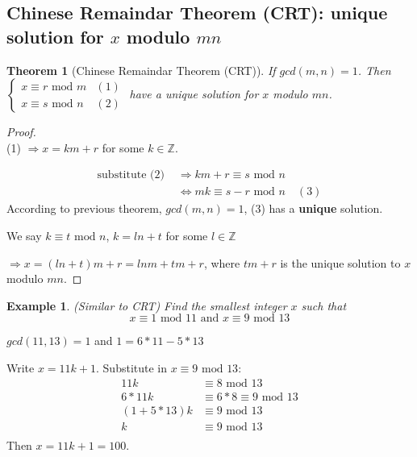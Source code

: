 \documentclass[11pt,a4paper]{article}
\newtheorem{theorem}{Theorem}
\newtheorem{example}{Example}
\begin{document}
\subsection{Chinese Remaindar Theorem (CRT): unique solution for $x$ modulo $mn$}
\begin{theorem}[Chinese Remaindar Theorem (CRT)]
\quad

If $gcd(m,n)=1$. Then $\left\{\begin{matrix}
    x\equiv r \text{ mod }m& (1)\\
    x\equiv s \text{ mod }n& (2)
\end{matrix}\right.$ have a unique solution for $x$ modulo $mn$.
\end{theorem}
\begin{proof}
\quad\\
(1) $\Rightarrow x=km+r$ for some $k\in \mathbb{Z}$.

\begin{equation}
    \begin{aligned}
        \text{substitute (2) }&\Rightarrow	km+r\equiv s \text{ mod }n\\ &\Leftrightarrow	mk\equiv s-r \text{ mod }n\quad (3)
    \end{aligned}
    \nonumber
\end{equation}
According to previous theorem, $gcd(m,n)=1$, (3) has a \textbf{unique} solution.

We say $k\equiv t \text{ mod }n$, $k=ln+t$ for some $l\in \mathbb{Z}$

$\Rightarrow x=(ln+t)m+r=lnm+tm+r$, where $tm+r$ is the unique solution to $x$ modulo $mn$.
\end{proof}

\begin{example}(Similar to CRT)
Find the smallest integer $x$ such that $$x\equiv 1 \text{ mod }11\text{ and }x\equiv  9\text{ mod }13$$
\end{example}
$gcd(11,13)=1$ and $1=6*11-5*13$

Write $x=11k+1$. Substitute in $x\equiv 9 \text{ mod }13$:
\begin{equation}
    \begin{aligned}
        11k&\equiv 8 \text{ mod }13\\
        6*11k&\equiv 6*8\equiv 9 \text{ mod }13\\
        (1+5*13)k&\equiv 9 \text{ mod }13\\
        k&\equiv 9 \text{ mod }13\\
    \end{aligned}
    \nonumber
\end{equation}
Then $x=11k+1=100$.
\end{document}
